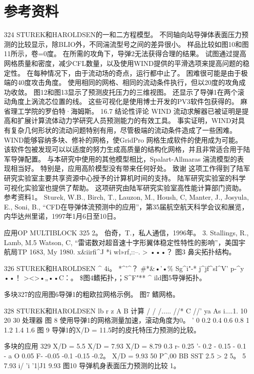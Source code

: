 \documentclass[UTF8,11pt,a4paper,openany,fontset=fandol]{ctexbook}
\begin{document}
\section{参考资料}
324 STUREK和HAROLDSEN的一和二方程模型。 不同轴向站导弹体表面压力预测的比较显示，除BLIO外，不同湍流型号之间的差异很小。 样品比较如图10和图11所示，卷=0度。 在所需的攻角下，导弹2无法获得合理的结果。 试图通过提高网格质量和密度，减少CFL数量，以及使用WIND提供的平滑选项来提高问题的稳定性。 在每种情况下，由于流动场的奇点，运行都中止了。 困难很可能是由于极端的40度攻击角度。 使用相同的网格、相同的流动条件执行，但以20度的攻角成功收敛。 图12和图13显示了预测皮托压力的三维视图。 还显示了导弹1在两个滚动角度上涡流芯位置的线。 这些可视化是使用博士开发的PV3软件包获得的。 麻省理工学院的罗伯特·海姆斯。 16.7 结论性评论 WIND 流动求解器已被证明是提高和扩展计算流体动力学研究人员预测能力的有效工具。 事实证明，WIND对具有复杂几何形状的流动问题特别有用，尽管极端的流动条件造成了一些困难。 WIND能够容纳多块、修补的网格，使GridPro 网格生成软件的使用成为可能。 该软件包被发现可以以适度的努力生成高质量的结构化网格，并且非常适合用于陆军导弹配置。 与本研究中使用的其他模型相比，Spalart-Allmaras 湍流模型的表现相当好。 特别是，应用高阶模型没有带来任何好处。 致谢 这项工作得到了陆军研究实验室主要共享资源中心授予的计算机时间的支持。 陆军研究实验室的科学可视化实验室也提供了帮助。 这项研究由陆军研究实验室高性能计算部门资助。 参考资料1。 Sturek, W.B., Birch, T., Lauzon, M., Housh, C, Manter, J., Josyula, E., Soni, B., “CFD在导弹体流预测中的应用”，第35届航空航天科学会议和展览，内华达州里诺，1997年1月6日至10日。

应用OP MULTIBLOCK 325 2。 伯奇，T.，私人通信，1996年。 3. Stallings, R., Lamb, M.5 Watson, C, “雷诺数对超音速十字形翼体稳定性特性的影响”，美国宇航局TP 1683, My 1980. x\&iirfi\textasciicircum{}J *i wl»rf,::--. > •••？ 图3 鼻尖拓扑结构。

326 STUREK和HAROLDSEN \textasciicircum{} 4i。 *\textasciicircum{}'\textasciicircum{}？ \#*\&•'•\% Sg\textasciicircum{}i"-* j\textasciicircum{}jf\textasciicircum{}sl\textasciicircum{}V' p-\textasciicircum{}y ••！ ><>•„••C：。 \$图4鳍拓扑，；S\textasciicircum{}F"** \textasciicircum{} ild图5导弹拓扑。

多块327的应用图6导弹1的粗欧拉网格示例。 图7 鳍网格。

328 STUREK和HAROLDSEN lb r z A B 计算 / / /..... //* C //' ya As i....1. 10 20 30 处理器 图 8 使用导弹1的网格测量加速，滚动角度为0。 ' 0 0.2 0.4 0.6 0.8 1 1.2 1.4 1.6 图 9 导弹1的X/D = 11.5时的皮托特压力预测的比较。

多块的应用 329 X/D = 5.5 X/D = 7.93 X/D = 8.79 0.3 r- 0.25 '- 0.2 - 0.15 - 0.1 - a O 0.05 F- -0.05 -0.1 -0.15 -0.2。 X/D = 9.93 50 P\textasciicircum{},00 BB SST 2.5 > 2 5。 5 7.93 i/ 'i '1|J1 9.93 图10 导弹机身表面压力预测的比较 1。
\end{document}
